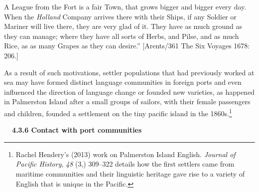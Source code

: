\begin{styleStandard}
A League from the Fort is a fair Town, that grows bigger and bigger every day. When the \textit{Holland} Company arrives there with their Ships, if any Soldier or Mariner will live there, they are very glad of it. They have as much ground as they can manage; where they have all sorts of Herbs, and Pilse, and as much Rice, as as many Grapes as they can desire.” [Arents/361 The Six Voyages 1678: 206.]
\end{styleStandard}

\begin{styleStandard}
As a result of such motivations, settler populations that had previously worked at sea may have formed distinct language communities in foreign ports and even influenced the direction of language change or founded new varieties, as happened in Palmerston Island after a small groups of sailors, with their female passengers and children, founded a settlement on the tiny pacific island in the 1860s.\footnote{ Rachel Hendery’s (2013) work on Palmerston Island English. \textit{Journal of Pacific History}, \textit{48} (3,) 309–322 details how the first settlers came from maritime communities and their linguistic heritage gave rise to a variety of English that is unique in the Pacific. }
\end{styleStandard}

\begin{styleStandard}
\textbf{\ \ 4.3.6 Contact with port communities}
\end{styleStandard}

